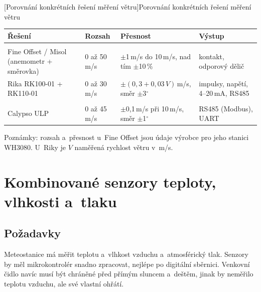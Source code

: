 \begin{center}
\noindent\begin{minipage}{\textwidth}
[Porovnání konkrétních řešení měření větru]{Porovnání konkrétních řešení měření větru~\cite{macek,rikadir,calypso,fineoffset,rikawind}}
\label{tab:vitr}
\scriptsize
\renewcommand{\arraystretch}{1.25}
\begin{tabularx}{\textwidth}{|Y{1.2}|Y{0.8}|Y{1.1}|Y{0.9}|}
\hline
\textbf{Řešení} & \textbf{Rozsah} & \textbf{Přesnost} & \textbf{Výstup} \\
\hline
{} \\
\hline
Fine Offset / Misol (anemometr + směrovka) & 0 až 50\,m/s & $\pm$1\,m/s do 10\,m/s, nad tím $\pm$10\,\% & kontakt, odporový dělič \\
\hline
Rika RK100-01 + RK110-01 & 0 až 30\,m/s & $\pm(0{,}3+0{,}03\,V)$\,m/s, směr $\pm$3$^\circ$ & impulsy, napětí, 4--20\,mA, RS485 \\
\hline
{} \\
\hline
Calypso ULP & 0 až 45\,m/s & $\pm$0,1\,m/s při 10\,m/s, směr $\pm$1$^\circ$ & RS485 (Modbus), UART \\
\hline
\end{tabularx}

\vspace{0.3em}
{\scriptsize
Poznámky: rozsah a~přesnost u~Fine Offset jsou údaje výrobce pro jeho stanici WH3080. U~Riky je $V$ naměřená rychlost větru v~m/s.\par}
\end{minipage}
\end{center}

\chapter{Kombinované senzory teploty, vlhkosti a~tlaku}

\section{Požadavky}

Meteostanice má měřit teplotu a~vlhkost vzduchu a~atmosférický tlak. Senzory by měl mikrokontrolér snadno zpracovat, nejlépe po digitální sběrnici. Venkovní čidlo navíc musí být chráněné před přímým sluncem a~deštěm, jinak by neměřilo teplotu vzduchu, ale své vlastní ohřátí.

